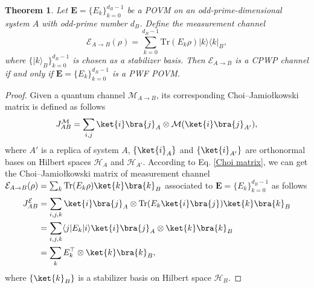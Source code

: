 \documentclass[aps,pra,twocolumn,floatfix,amsfonts,10pt]{revtex4-2}
\newtheorem{theorem}{Theorem}
\begin{document}
\begin{theorem}\label{theorem 1}
	Let $\mathbf{E}=\{E_k\}_{k=0}^{d_B-1}$ be a POVM on an odd-prime-dimensional system $A$ with odd-prime number $d_B$. 
	Define the measurement channel
	\begin{equation}
		\mathcal E_{A\rightarrow B}(\rho) = \sum_{k=0}^{d_B-1} \mathrm{Tr}(E_k\rho)|k\rangle\langle k|_B,
	\end{equation}
	where $\{|k\rangle_B\}_{k=0}^{d_B-1}$ is chosen as a stabilizer basis.
	Then $\mathcal{E}_{A \rightarrow B}$ is a CPWP channel if and only if $\mathbf{E}=\{E_k\}_{k=0}^{d_B-1}$ is a PWF POVM.
\end{theorem}
\begin{proof}
	Given a quantum channel $\mathcal{M}_{A \rightarrow B}$, its corresponding Choi–Jamiołkowski matrix is defined as follows \cite{C1975,J1972}
	\begin{equation}\label{Choi matrix}
		J_{AB}^{\mathcal{M}} = \displaystyle\sum_{i,j}\ket{i}\bra{j}_A\otimes \mathcal{M}(\ket{i}\bra{j}_{A'}),
	\end{equation}
	where $A'$ is a replica of system $A$, $\{\ket{i}_A\}$ and $\{\ket{i}_{A'}\}$ are orthonormal bases on Hilbert spaces $\mathcal{H}_A$ and $\mathcal{H}_{A'}$.
	According to Eq. \eqref{Choi matrix}, we can get the Choi–Jamiołkowski matrix of measurement channel $\mathcal{E}_{A \rightarrow B}(\rho) = \sum_{k} \mathrm{Tr}(E_k \rho) \ket{k} \bra{k}_B$ associated to $\mathbf{E}=\{E_k\}_{k=0}^{d_B-1}$ as follows
	\begin{equation}
		\begin{aligned}
				J_{AB}^{\mathcal{E}} &= \displaystyle\sum_{i,j,k}\ket{i}\bra{j}_A\otimes \mathrm{Tr}(E_k\ket{i}\bra{j})\ket{k}\bra{k}_B \\ &= \displaystyle\sum_{i,j,k}\langle j|E_k|i \rangle \ket{i}\bra{j}_A\otimes \ket{k}\bra{k}_B \\ &= \displaystyle\sum_{k} E_k^{\top}\otimes \ket{k}\bra{k}_B,
		\end{aligned}
	\end{equation}
	where $\{\ket{k}_B\}$ is a stabilizer basis on Hilbert space $\mathcal{H}_B$.
	

\end{proof}
\end{document}
